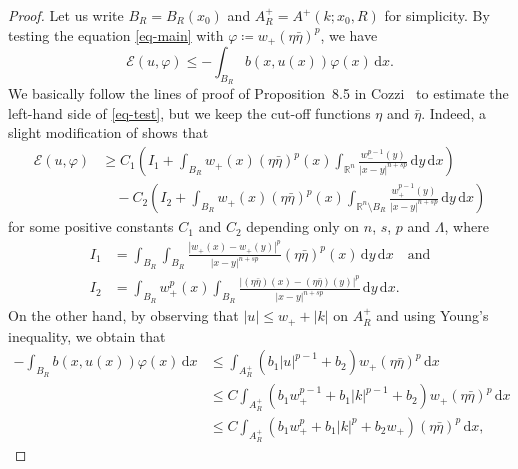 \documentclass[11pt]{amsart}
\theoremstyle{plain}
\theoremstyle{definition}
\numberwithin{equation}{section}
\begin{document}
\begin{proof}
Let us write $B_R=B_R(x_0)$ and $A^+_R=A^+(k; x_0, R)$ for simplicity. By testing the equation \eqref{eq-main} with $\varphi\coloneqq w_+(\eta\bar{\eta})^p$, we have
\begin{equation}\label{eq-test}
\mathcal{E}(u, \varphi)\leq -\int_{B_R} b(x, u(x)) \varphi(x) \,\mathrm{d}x.
\end{equation}
We basically follow the lines of proof of Proposition~8.5 in Cozzi~\cite{Coz17} to estimate the left-hand side of \eqref{eq-test}, but we keep the cut-off functions $\eta$ and $\bar{\eta}$. Indeed, a slight modification of \cite[(8.4)--(8.6)~and~(8.10)--(8.12)]{Coz17} shows that
\begin{equation*}
\begin{split}
    \mathcal{E}(u, \varphi)
    &\geq C_1 \left( I_1 + \int_{B_R} w_+(x) (\eta \bar{\eta})^p(x) \int_{\mathbb{R}^n} \frac{w_-^{p-1}(y)}{|x-y|^{n+sp}} \,\mathrm{d}y \,\mathrm{d}x \right) \\
    &\quad - C_2 \left( I_2 + \int_{B_R} w_+(x)(\eta\bar{\eta})^p(x) \int_{\mathbb{R}^n \setminus B_R} \frac{w_+^{p-1}(y)}{|x-y|^{n+sp}} \,\mathrm{d}y \,\mathrm{d}x \right)
\end{split}
\end{equation*}
for some positive constants $C_1$ and $C_2$ depending only on $n$, $s$, $p$ and $\Lambda$, where
\begin{equation*}
\begin{split}
I_1 &= \int_{B_R} \int_{B_R} \frac{|w_+(x)-w_+(y)|^p}{|x-y|^{n+sp}} (\eta\bar{\eta})^p(x) \,\mathrm{d}y\,\mathrm{d}x \quad\text{and} \\
I_2 &= \int_{B_R} w_+^p(x) \int_{B_R} \frac{|(\eta\bar{\eta})(x)-(\eta\bar{\eta})(y)|^p}{|x-y|^{n+sp}} \,\mathrm{d}y \,\mathrm{d}x.
\end{split}
\end{equation*}
On the other hand, by observing that $|u| \leq w_++|k|$ on $A^+_R$ and using Young's inequality, we obtain that
\begin{equation*}
\begin{split}
-\int_{B_R} b(x, u(x)) \varphi(x) \,\mathrm{d}x
&\leq \int_{A^+_R} (b_1|u|^{p-1} + b_2) w_+ (\eta\bar{\eta})^p \,\mathrm{d}x \\
&\leq C \int_{A^+_R} (b_1 w_+^{p-1} + b_1 |k|^{p-1} + b_2) w_+ (\eta\bar{\eta})^p \,\mathrm{d}x \\
&\leq C \int_{A^+_R} (b_1 w_+^{p} + b_1 |k|^p + b_2 w_+)(\eta\bar{\eta})^p \,\mathrm{d}x,
\end{split}

\end{equation*}
\end{proof}
\end{document}
